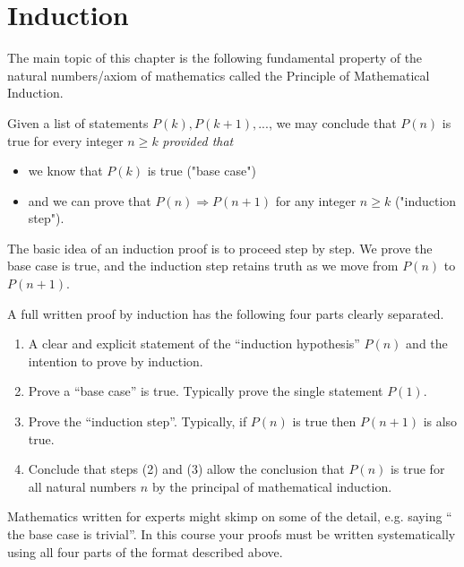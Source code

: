 \documentclass[11pt,dvipsnames]{book}
\numberwithin{equation}{section} %
\numberwithin{figure}{section} %
\numberwithin{table}{section} %
\begin{document}
\section{Induction}

The main topic of this chapter is the following fundamental property of the natural numbers/axiom of mathematics called the Principle of Mathematical Induction.

\begin{definition}
Given a list of statements $P(k),P(k+1),...$, we may conclude that $P(n)$ is true for every integer $n\geqslant k$ {\em provided that}

\begin{itemize}
\item we know that $P(k)$ is true ("base case")
\item and we can prove that $P(n)\Rightarrow P(n+1)$ for any integer $n\geqslant k$ ("induction step").
\end{itemize}
\end{definition}

The basic idea of an induction proof is to proceed step by step.
We prove the base case is true, and the induction step retains truth as we move from $P(n)$ to $P(n+1)$.

A full written proof by induction has the following four parts clearly separated.
\begin{enumerate}
	\item A clear and explicit statement of the ``induction hypothesis'' $P(n)$ and the intention to prove by induction.
	\item Prove a ``base case'' is true. Typically prove the single statement $P(1)$.
	\item Prove the ``induction step''.  Typically, if $P(n)$ is true then $P(n+1)$ is also true.
	\item Conclude that steps (2) and (3) allow the conclusion that $P(n)$ is true for all natural numbers $n$ by the principal of mathematical induction.
\end{enumerate}
Mathematics written for experts might skimp on some of the detail, e.g. saying `` the base case is trivial''. In this course your proofs must be written systematically using all four parts of the format described above.
\end{document}
